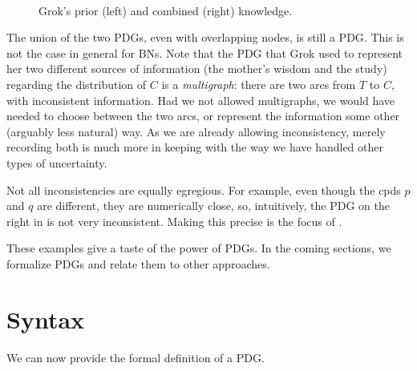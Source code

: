 \begin{example}
\begin{figure}
	\fi
	\hfill~
	\caption{Grok's prior (left) and combined (right) knowledge.}
	\label{fig:grok-combine}
\end{figure}

The union of the two PDGs, even with overlapping 
nodes, is still a PDG.
This is not the case in general
for BNs.
Note that the PDG that Grok used to
represent her two different sources of information (the mother's wisdom and the
study) regarding the distribution of $C$ is a \emph{multigraph}: there are two
arcs from $T$ to $C$, with inconsistent information.
Had we not allowed multigraphs, we would have needed to choose between the two arcs, or represent the
information some other (arguably less natural) way. As we are already allowing
inconsistency, merely recording both is much more in keeping with the way we
have handled other types of uncertainty. 
\end{example}

Not all inconsistencies are equally egregious. For example, even though the cpds
$p$ and $q$ are different, they are numerically close, so, intuitively, the PDG on the right in
 is not very inconsistent.
Making this precise 
is
the focus of .

These examples give a taste of the power of PDGs.  
In the coming sections, we formalize PDGs and relate them to other approaches.
	
	
\section{Syntax}\label{sec:formal+syntax}
We can now provide the formal definition of a PDG. 


